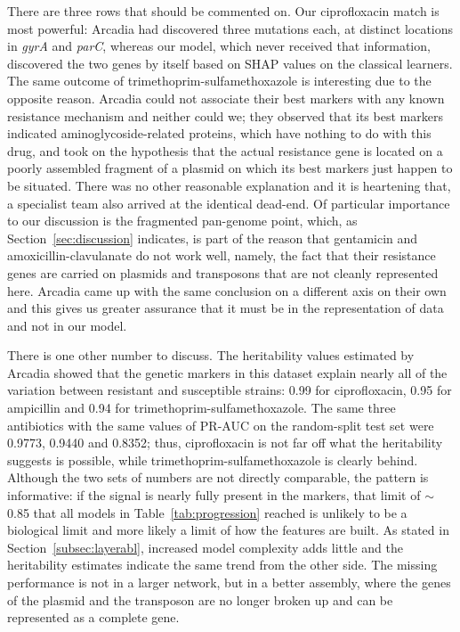 There are three rows that should be commented on. Our ciprofloxacin match is most
powerful: Arcadia had discovered three mutations each, at distinct locations in
\textit{gyrA} and \textit{parC}, whereas our model, which never received that
information, discovered the two genes by itself based on SHAP values on the
classical learners. The same outcome of trimethoprim-sulfamethoxazole is
interesting due to the opposite reason. Arcadia could not associate their best
markers with any known resistance mechanism and neither could we; they observed
that its best markers indicated aminoglycoside-related proteins, which have
nothing to do with this drug, and took on the hypothesis that the actual
resistance gene is located on a poorly assembled fragment of a plasmid on which
its best markers just happen to be situated. There was no other reasonable
explanation and it is heartening that, a specialist team also arrived at the
identical dead-end. Of particular importance to our discussion is the fragmented
pan-genome point, which, as Section~\ref{sec:discussion} indicates, is part of
the reason that gentamicin and amoxicillin-clavulanate do not work well, namely,
the fact that their resistance genes are carried on plasmids and transposons that
are not cleanly represented here. Arcadia came up with the same conclusion on a
different axis on their own and this gives us greater assurance that it must be
in the representation of data and not in our model.

There is one other number to discuss. The heritability values estimated by
Arcadia showed that the genetic markers in this dataset explain nearly all of the
variation between resistant and susceptible strains: 0.99 for ciprofloxacin, 0.95
for ampicillin and 0.94 for trimethoprim-sulfamethoxazole. The same three
antibiotics with the same values of PR-AUC on the random-split test set were 0.9773,
0.9440 and 0.8352; thus, ciprofloxacin is not far off what the heritability
suggests is possible, while trimethoprim-sulfamethoxazole is clearly behind.
Although the two sets of numbers are not directly comparable, the pattern is
informative: if the signal is nearly fully present in the markers, that limit of
$\sim$0.85 that all models in Table~\ref{tab:progression} reached is unlikely to be a
biological limit and more likely a limit of how the features are built. As stated
in Section~\ref{subsec:layerabl}, increased model complexity adds little and the
heritability estimates indicate the same trend from the other side. The missing
performance is not in a larger network, but in a better assembly, where the genes
of the plasmid and the transposon are no longer broken up and can be represented
as a complete gene.

